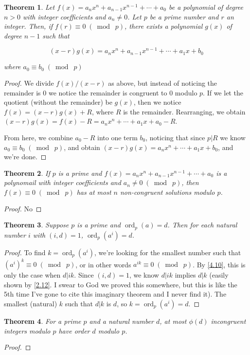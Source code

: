 \documentclass{article}
\DeclareMathOperator{\ord}{ord}
\newtheorem{thm}{Theorem}[section]
\numberwithin{equation}{thm}
\providecommand{\gmod}[1]{\; (\bmod \; #1)}
\begin{document}
\begin{thm} \label{6.2}
  Let $f(x) = a_n x^n + a_{n-1} x^{n-1} + \cdots + a_0$ be a polynomial of degree $n > 0$ with integer coefficients and $a_n \neq 0$. Let $p$ be a prime number and $r$ an integer. Then, if $f(r) \equiv 0 \gmod p$, there exists a polynomial $g(x)$ of degree $n-1$ such that

  $$(x-r)g(x) = a_nx^n + a_{n-1}x^{n-1} + \cdots + a_1x + b_0$$

  where $a_0 \equiv b_0 \gmod p$
\end{thm}

\begin{proof}
  We divide $f(x) / (x-r)$ as above, but instead of noticing the remainder is $0$ we notice the remainder is congruent to $0$ modulo $p$. If we let the quotient (without the remainder) be $g(x)$, then we notice $f(x) = (x-r) g(x) + R$, where $R$ is the remainder. Rearranging, we obtain $(x-r) g(x) = f(x) - R = a_n x^n + \cdots + a_1 x + a_0 - R$.

  From here, we combine $a_0 - R$ into one term $b_0$, noticing that since $p | R$ we know $a_0 \equiv b_0 \gmod p$, and obtain $(x-r) g(x) = a_n x^n + \cdots + a_1 x + b_0$, and we're done.
\end{proof}



\begin{thm} \label{6.3}
  If $p$ is a prime and $f(x) = a_n x^n + a_{n-1} x^{n-1} + \cdots + a_0$ is a polynomail with integer coefficients and $a_n \neq 0 \gmod p$, then $f(x) \equiv 0 \gmod p$ has at most $n$ non-congruent solutions modulo $p$.
\end{thm}

\begin{proof}
  No
\end{proof}



\begin{thm} \label{6.4}
  Suppose $p$ is a prime and $\ord_p (a) = d$. Then for each natural number $i$ with $(i, d) = 1$, $\ord_p(a^i) = d$.
\end{thm}

\begin{proof}
  To find $k = \ord_p (a^i)$, we're looking for the smallest number such that $(a^i)^k \equiv 0 \gmod p$, or in other words $a^{ik} \equiv 0 \gmod p$. By \ref{4.10}, this is only the case when $d | ik$. Since $(i, d) = 1$, we know $d | ik$ implies $d | k$ (easily shown by \ref{2.12}. I swear to God we proved this somewhere, but this is like the 5th time I've gone to cite this imaginary theorem and I never find it). The smallest (natural) $k$ such that $d | k$ is $d$, so $k = \ord_p (a^i) = d$.
\end{proof}



\begin{thm} \label{6.5}
  For a prime $p$ and a natural number $d$, at most $\phi (d)$ incongruent integers modulo $p$ have order $d$ modulo $p$.
\end{thm}

\begin{proof}
  
\end{proof}
\end{document}
